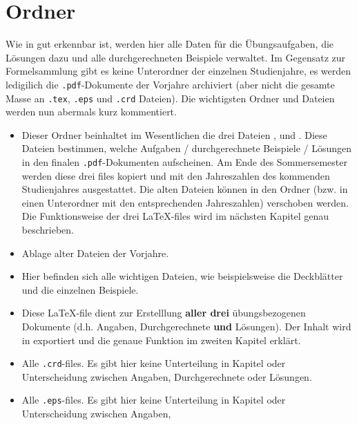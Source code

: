 \section{Ordner }

Wie in  gut erkennbar ist, werden hier alle Daten für
die Übungsaufgaben, die Lösungen dazu und alle durchgerechneten Beispiele
verwaltet. Im Gegensatz zur Formelsammlung gibt es keine Unterordner der
einzelnen Studienjahre, es werden ledigilich die {\tt .pdf}-Dokumente der 
Vorjahre archiviert (aber nicht die gesamte Masse an {\tt .tex}, {\tt .eps} und 
{\tt .crd} Dateien). Die wichtigsten Ordner und Dateien werden nun abermals kurz
kommentiert.

\begin{itemize}
  \item {} Dieser Ordner beinhaltet im
    Wesentlichen die drei Dateien ,
     und 
    . Diese Dateien bestimmen, welche
    Aufgaben / durchgerechnete Beispiele / Lösungen in den finalen
    {\tt .pdf}-Dokumenten aufscheinen. Am Ende des Sommersemester werden diese
    drei files kopiert und mit den Jahreszahlen des kommenden Studienjahres
    ausgestattet. Die alten Dateien können in den Ordner
     (bzw. in einen Unterordner mit den
    entsprechenden Jahreszahlen) verschoben werden. Die Funktionsweise der drei
    \LaTeX-files wird im nächsten Kapitel genau beschrieben.
  \item {} Ablage alter Dateien der Vorjahre.
  \item {} Hier befinden sich alle wichtigen Dateien, wie
    beispielsweise die Deckblätter und die einzelnen Beispiele.
  \item {} Diese \LaTeX-file dient zur Erstelllung
    {\bf aller drei} übungsbezogenen Dokumente (d.h. Angaben, Durchgerechnete
    {\bf und} Lösungen). Der Inhalt wird in  exportiert
    und die genaue Funktion im zweiten Kapitel erklärt.
  \item {} Alle {\tt .crd}-files. Es gibt hier keine
    Unterteilung in Kapitel oder Unterscheidung zwischen Angaben,
    Durchgerechnete oder Lösungen.
  \item {} Alle {\tt .eps}-files. Es gibt hier keine
    Unterteilung in Kapitel oder Unterscheidung zwischen Angaben,

\end{itemize}
